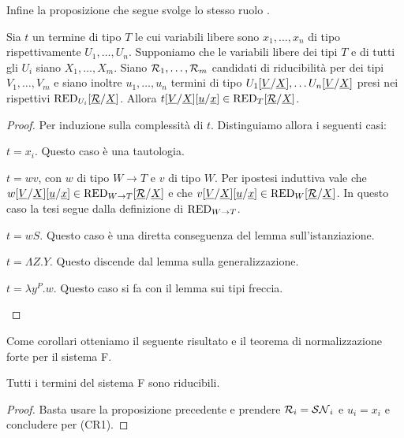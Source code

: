 \documentclass[]{marticle}
\begin{document}
Infine la proposizione che segue svolge lo stesso ruolo .
\begin{block} [Proposizione]
    Sia $t$ un termine di tipo $T$ le cui variabili libere sono $x_1, \dots,
    x_n$ di tipo rispettivamente $U_1, \dots, U_n$. Supponiamo che le variabili
    libere dei tipi $T$ e di tutti gli $U_i$ siano $X_1, \dots, X_m$. Siano
    $\mathcal{R}_1, \dots, \mathcal{R}_m$ candidati di riducibilit\`a per dei tipi $V_1,
    \dots, V_m$ e siano inoltre $u_1, \dots, u_n$ termini di tipo
    $U_1[\underline{V}/\underline{X}], \dots
    U_n[\underline{V}/\underline{X}]$ presi nei rispettivi
    $\text{RED}_{U_i}[\underline{\mathcal{R}}/\underline{X}]$. Allora $t[\underline{V}/\underline{X}]
    [\underline{u}/\underline{x}] \in \text{RED}_{T}[\underline{\mathcal{R}}/\underline{X}]$.
\newcommand{\subvx}{\sub{\underline{V}}{\underline{X}}}
\newcommand{\subut}{\sub{\underline{u}}{\underline{x}}}
\begin{proof}
    Per induzione sulla complessit\`a di $t$. Distinguiamo allora i seguenti
    casi:
    \begin{nlist}[i]
        \item $t=x_i$. Questo caso \`e una tautologia.
        \item $t=wv$, con $w$ di tipo $W\rightarrow T$ e $v$ di tipo $W$. Per
            ipostesi induttiva vale che $w\subvx\subut\in \red{W \rightarrow
            T}\subrx$ e che $v\subvx\subut \in \red{W}\subrx$. In questo caso la
            tesi segue dalla definizione di $\text{RED}_{W\rightarrow T}$.
        \item $t=wS$. Questo caso \`e una diretta conseguenza del lemma 
            sull'istanziazione. 
        \item $t=\Lambda Z. Y$. Questo discende dal lemma  sulla
            generalizzazione.
        \item $t=\lambda y^P.w$. Questo caso si fa con il lemma  sui tipi
            freccia.
    \end{nlist}
\end{proof}
\end{block}

Come corollari otteniamo il seguente risultato e il teorema di normalizzazione
forte per il sistema F.

\begin{block} [Proposizione]
    Tutti i termini del sistema F sono riducibili.
\begin{proof}
    Basta usare la proposizione precedente e prendere $\mathcal{R}_i=\mathcal{SN}_i$ e
    $u_i=x_i$ e concludere per (CR1).
\end{proof}
\end{block}
\end{document}
